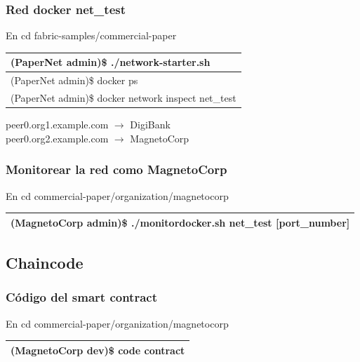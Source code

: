\documentclass{beamer}
\begin{document}
	\begin{frame}
		\frametitle{Red docker net\_test}
		En cd fabric-samples/commercial-paper\\
		\begin{center}
			\begin{tabulary}{\linewidth}{L}
				\hline
				(PaperNet admin)\$ ./network-starter.sh \\
				\hline 
				(PaperNet admin)\$ docker ps \\
				\hline
				(PaperNet admin)\$ docker network inspect net\_test \\
				\hline
			\end{tabulary} 
		\end{center}
		peer0.org1.example.com $\rightarrow$ DigiBank\\
		peer0.org2.example.com $\rightarrow$ MagnetoCorp
	\end{frame}

	\begin{frame}
		\frametitle{Monitorear la red como MagnetoCorp}
		En cd commercial-paper/organization/magnetocorp\\
		\begin{center}
			\begin{tabulary}{\linewidth}{L}
				\hline
				(MagnetoCorp admin)\$ ./monitordocker.sh net\_test [port\_number] \\
				\hline
			\end{tabulary} 
		\end{center}
	\end{frame}
	
	\subsection{Chaincode}
	
	\begin{frame}
		\frametitle{Código del smart contract}
		En cd commercial-paper/organization/magnetocorp\\
		\begin{center}
			\begin{tabulary}{\linewidth}{L}
				\hline
				(MagnetoCorp dev)\$ code contract \\
				\hline
			\end{tabulary} 
		\end{center}
	\end{frame}
\end{document}
